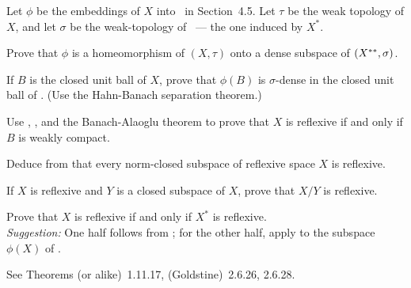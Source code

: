 \begin{enumerate}

\begin{excopy}
Let \(\phi\) be the embeddings of $X$ into \Xss\ in Section~4.5.
Let \(\tau\) be the weak topology of $X$, and let \(\sigma\)
be the weak\upstar-topology of \Xss\ --- the one induced by \(X^*\).
\begin{itemize}

Prove that \(\phi\) is a homeomorphism of \((X,\tau)\) onto a dense subspace
of \((X^{**}, \sigma)\).

If $B$ is the closed unit ball of $X$, prove that \(\phi(B)\)
is \(\sigma\)-dense in the closed unit ball
of \Xss. (Use the Hahn-Banach separation theorem.)

Use , , and the Banach-Alaoglu theorem to prove that $X$
 is reflexive if and only if $B$ is weakly compact.

Deduce from  that every norm-closed subspace of reflexive space $X$
 is reflexive.

If $X$ is reflexive and $Y$ is a closed subspace of $X$, prove that \(X/Y\) 
is reflexive.

Prove that $X$ is reflexive if and only if \(X^*\) is reflexive.\\
\emph{Suggestion:} One half follows from ; for the other half,
 apply  to the subspace \(\phi(X)\) of \Xss.

\end{itemize}
\end{excopy}

See \cite{Megginson1998} Theorems (or alike)~1.11.17,
(Goldstine)~2.6.26, 2.6.28.


\end{enumerate}
